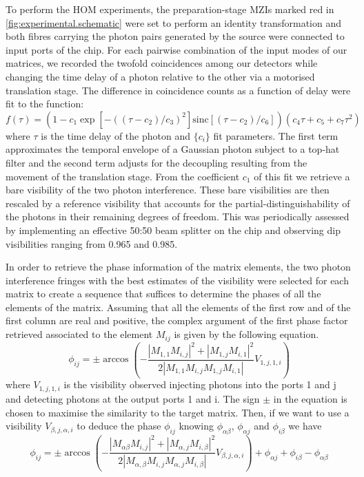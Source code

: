 To perform the HOM experiments, the preparation-stage MZIs marked red in \cref{fig:experimental.schematic} were set to perform an identity transformation and both fibres carrying the photon pairs generated by the source were connected to input ports of the chip.
For each pairwise combination of the input modes of our matrices, we recorded the twofold coincidences among our detectors while changing the time delay of a photon relative to the other via a motorised translation stage.
The difference in coincidence counts as a function of delay were fit to the function:
\begin{equation}
  f(\tau)=\left(1-c_1\exp[-((\tau - c_2)/c_3)^2]\mathrm{sinc}[(\tau - c_2)/c_6]\right)(c_4\tau + c_5 + c_7 \tau^2)
\end{equation}
where $\tau$ is the time delay of the photon and $\{c_i\}$ fit parameters.
The first term approximates the temporal envelope of a Gaussian photon subject to a top-hat filter and the second term adjusts for the decoupling resulting from the movement of the translation stage.
From the coefficient $c_1$ of this fit we retrieve a bare visibility of the two photon interference.
These bare visibilities are then rescaled by a reference visibility that accounts for the partial-distinguishability of the photons in their remaining degrees of freedom.
This was periodically assessed by implementing an effective 50:50 beam splitter on the chip and observing dip visibilities ranging from 0.965 and 0.985.

In order to retrieve the phase information of the matrix elements, the two photon interference fringes with the best estimates of the visibility were selected for each matrix to create a sequence that suffices to determine the phases of all the elements of the matrix.
Assuming that all the elements of the first row and of the first column are real and positive, the complex argument of the first phase factor retrieved associated to the element $M_{ij}$ is given by the following equation.
\begin{equation}
\phi_{ij}=\pm  \arccos\left( - \frac{|M_{1,1}M_{i,j}|^2+|M_{1,j}M_{i,1}|^2}{2 |M_{1,1}M_{i,j}M_{1,j}M_{i,1}|} V_{1,j,1,i} \right)
\end{equation}
where $V_{1,j,1,i}$ is the visibility observed injecting photons into the ports 1 and j and detecting photons at the output ports 1 and i.
The sign $\pm$ in the equation is chosen to maximise the similarity to the target matrix.
Then, if we want to use a visibility $V_{\beta,j,\alpha,i}$ to deduce the phase $\phi_{ij}$ knowing $\phi_{\alpha \beta}$, $\phi_{\alpha j}$ and $\phi_{i \beta}$ we have
\begin{equation}
\phi_{ij}=\pm   \arccos\left( - \frac{|M_{\alpha \beta}M_{i,j}|^2+|M_{\alpha,j}M_{i,\beta}|^2}{2 |M_{\alpha,\beta}M_{i,j}M_{\alpha,j}M_{i,\beta}|} V_{\beta,j,\alpha,i} \right) +\phi_{\alpha j} +\phi_{i \beta} -\phi_{\alpha \beta}
\end{equation}

